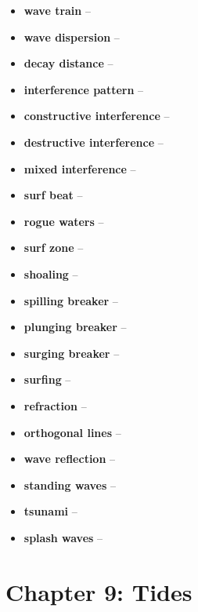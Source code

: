 \begin{itemize}
    \item \textbf{wave train} --
    \item \textbf{wave dispersion} --
    \item \textbf{decay distance} --
    \item \textbf{interference pattern} --
    \item \textbf{constructive interference} --
    \item \textbf{destructive interference} --
    \item \textbf{mixed interference} --
    \item \textbf{surf beat} --
    \item \textbf{rogue waters} --
    \item \textbf{surf zone} --
    \item \textbf{shoaling} --
    \item \textbf{spilling breaker} --
    \item \textbf{plunging breaker} --
    \item \textbf{surging breaker} --
    \item \textbf{surfing} --
    \item \textbf{refraction} --
    \item \textbf{orthogonal lines} --
    \item \textbf{wave reflection} --
    \item \textbf{standing waves} --
    \item \textbf{tsunami} --
    \item \textbf{splash waves} --

\end{itemize}

\section{Chapter 9: Tides}

